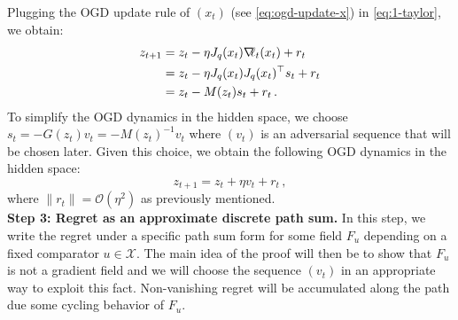 \documentclass[a4paper,11pt,fullpage]{article}
\theoremstyle{plain}
\theoremstyle{definition}
\theoremstyle{plain}
\let\nablaold\nabla
\renewcommand{\nabla}{\nablaold\mkern-2.5mu}
\begin{document}
Plugging the OGD update rule of $(x_t)$ (see \eqref{eq:ogd-update-x}) in \eqref{eq:1-taylor}, we obtain: 
\begin{align*}
z_{t+1} &= z_t - \eta J_q(x_t) \nabla \ell_t(x_t) + r_t \nonumber\\
        &= z_t - \eta J_q(x_t) J_q(x_t)^{\top} s_t + r_t \nonumber\\
        &=  z_t - M(z_t) s_t + r_t\,. 
\end{align*}
To simplify the OGD dynamics in the hidden space, we choose $s_t = - G(z_t) v_t = - M(z_t)^{-1} v_t$ where $(v_t)$ is an adversarial sequence that will be chosen later. Given this choice, we obtain the following OGD dynamics in the hidden space: 
\begin{equation}
\label{eq:ogd-hidden-space}
z_{t+1} = z_t + \eta v_t + r_t\,,
\end{equation}
where $\|r_t\| = \mathcal{O}(\eta^2)$ as previously mentioned.\\

\noindent\textbf{Step 3: Regret as an approximate discrete path sum.} In this step, we write the regret under a specific path sum form for some field $F_u$ depending on a fixed comparator $u \in \mathcal{X}$. The main idea of the proof will then be to show that $F_u$ is not a gradient field and we will choose the sequence $(v_t)$ in an appropriate way to exploit this fact. Non-vanishing regret will be accumulated along the path due some cycling behavior of $F_u$. 
\end{document}
